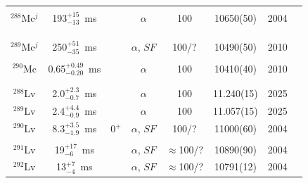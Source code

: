 \begin{center}
\begin{longtable}{c|ccccccl}
			&				&			&					&			& 				    &		&{\tiny\cite{Oganessian2017,Oganessian2022c,Oganessian2022d}}\\
$^{288}$Mc$^j$& 193$^{+15}_{-13}$~ms& 		&$\alpha$				&100			&10650(50)		&2004	&{\tiny\cite{Oganessian2004b,Dmitriev2005,Oganessian2005,Dressler2009,Oganessian2011,Oganessian2012}}\\
			&				&			&					&			& 				&		&{\tiny\cite{Oganessian2013,Rudolph2013,Dmitriev2014,Gates2015,Oganessian2015,Rudolph2015}}\\
			&				&			&					&			& 				&		&{\tiny\cite{Forsberg2016,Oganessian2017,Aksenov2017,Oganessian2017,Gates2018,Oganessian2022c}}\\
			&				&			&					&			& 				&		&{\tiny\cite{Oganessian2022d}}\\
$^{289}$Mc$^j$& 250$^{+51}_{-35}$~ms& 	&$\alpha$, $SF$		&100/?		&10490(50)		&2010	&{\tiny\cite{Oganessian2010,Oganessian2011,Oganessian2011a,Oganessian2012a,Oganessian2015,Oganessian2017}}\\
			&				&			&					&			& 				&		&{\tiny\cite{Oganessian2015,Oganessian2017,Khuyagbaatar2019,Oganessian2022d}}\\
$^{290}$Mc	& 0.65$^{+0.49}_{-0.20}$~ms& 	&$\alpha$		&100		&10410(40)		&2010	&{\tiny\cite{Oganessian2010,Oganessian2011,Oganessian2011a,Oganessian2012a,Oganessian2013b,Khuyagbaatar2014}}\\
			&				&			&					&			& 				&		&{\tiny\cite{Khuyagbaatar2019}}\\
\hline\\
$^{288}$Lv	& 2.0$^{+2.3}_{-0.7}$~ms&   &$\alpha$	        &100		&11.240(15)		&2025	&{\tiny\cite{Oganessian2025}}\\
$^{289}$Lv	& 2.4$^{+4.4}_{-0.9}$~ms&   &$\alpha$	        &100		&11.057(15)		&2025	&{\tiny\cite{Oganessian2025}}\\
$^{290}$Lv	& 8.3$^{+3.5}_{-1.9}$~ms&0$^+$&$\alpha$, $SF$	&100/?		&11000(60)		&2004	&{\tiny\cite{Oganessian2004,Oganessian2004a,Oganessian2005a,Oganessian2006,Oganessian2011a,Oganessian2012a}}\\
			&				&			&					&			& 				&		&{\tiny\cite{Oganessian2015,Oganessian2017,Gates2024}}\\
$^{291}$Lv	& 19$^{+17}_{-6}$~ms&		&$\alpha$, $SF$		&$\approx$100/?&10890(90)	&2004	&{\tiny\cite{Oganessian2004,Oganessian2004a,Oganessian2006,Oganessian2011a,Oganessian2015,Oganessian2017}}\\
$^{292}$Lv	& 13$^{+7}_{-4}$~ms&		&$\alpha$, $SF$		&$\approx$100/?&10791(12)	&2004	&{\tiny\cite{Oganessian2004,Oganessian2004a,Oganessian2005a,Oganessian2011a,Hofmann2012,Morita2014}}\\

\end{longtable}
\end{center}
